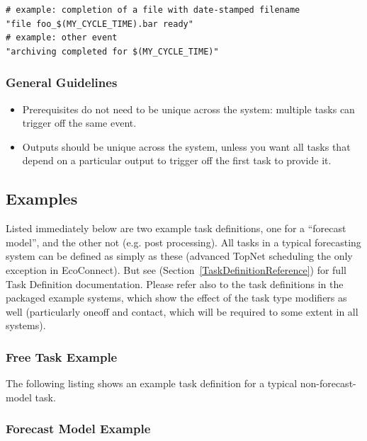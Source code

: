 \documentclass[11pt,a4paper]{article}
\begin{document}
\lstset{language=Python}
\begin{lstlisting}
# example: completion of a file with date-stamped filename
"file foo_$(MY_CYCLE_TIME).bar ready"
# example: other event
"archiving completed for $(MY_CYCLE_TIME)"
\end{lstlisting}


\subsubsection{General Guidelines}

\begin{itemize}

    \item Prerequisites do not need to be unique across the system:
        multiple tasks can trigger off the same event.

    \item Outputs should be unique across the system, unless you want
        all tasks that depend on a particular output to trigger off the
        first task to provide it.

\end{itemize}


\subsection{Examples}

Listed immediately below are two example task definitions, one for a
``forecast model'', and the other not (e.g. post processing). All tasks
in a typical forecasting system can be defined as simply as these
(advanced TopNet scheduling the only exception in EcoConnect). 
But see (Section~\ref{TaskDefinitionReference}) for full Task Definition
documentation. Please refer also to the task definitions in the packaged
example systems, which show the effect of the task type modifiers as well
(particularly oneoff and contact, which will be required to some extent
in all systems).


\subsubsection{Free Task Example}

The following listing shows an example task definition for a
typical non-forecast-model task.
\lstset{language=cylctaskdef}

{

}

\subsubsection{Forecast Model Example}
\end{document}
